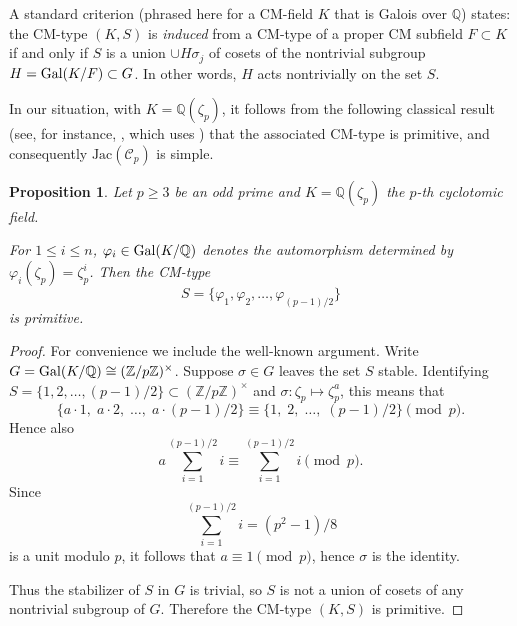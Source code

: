 \documentclass[a4paper,12pt]{amsart}
\def\Gal{{\rm Gal}}
\def\cC{{\mathcal C}}
\numberwithin{equation}{section}
\theoremstyle{plain}
\numberwithin{thm}{section}
\newtheorem{pro}[thm]{Proposition}
\begin{document}
A standard criterion (phrased here for a CM-field $K$ that is Galois over $\mathbb{Q}$) states: the CM-type $(K,S)$ is \emph{induced} from a CM-type of a proper CM subfield $F\subset K$ if and only if $S$ is a union $\cup  H\sigma_j$ of cosets of the nontrivial subgroup $H=\Gal(K/F)\subset G$.
In other words, $H$ acts nontrivially on the set $S$.

In our situation, with \(K = \mathbb{Q}(\zeta_p)\), 
it follows from the following classical result (see, for instance, \cite[page~24]{Lang}, which uses
\cite[Prop.~26]{ST}) 
that the associated CM-type is primitive, and consequently $\textrm{Jac}(\cC_p)$ is simple.



\begin{pro}
Let \(p\ge 3\) be an odd prime and \(K=\mathbb{Q}(\zeta_p)\) the $p$-th cyclotomic field.

For \(1\le i\le n\), \(\varphi_i\in\Gal(K/\mathbb{Q})\) denotes the automorphism determined by
\(\varphi_i(\zeta_p)=\zeta_p^i\).
Then the CM-type
\[
S=\{\varphi_1,\varphi_2,\dots,\varphi_{(p-1)/2}\}
\]
is primitive.
\end{pro}

\begin{proof}
For convenience we include the well-known argument. Write \(G=\Gal(K/\mathbb{Q})\cong(\mathbb{Z}/p\mathbb{Z})^\times\).
Suppose \(\sigma\in G\) leaves the set \(S\) stable. Identifying \(S= \{1,2,\dots,(p-1)/2\}\subset(\mathbb{Z}/p\mathbb{Z})^\times\) and $\sigma\colon \zeta_p\mapsto\zeta_p^a$,
this means that 
\[
\{a\cdot 1,\; a\cdot 2,\; \dots,\; a\cdot (p-1)/2\}
\equiv
\{1,\;2,\;\dots,\;(p-1)/2\}
\pmod p.
\]
Hence also
\[
a\sum_{i=1}^{(p-1)/2} i \equiv \sum_{i=1}^{(p-1)/2} i \pmod p.
\]
Since
\[
\sum_{i=1}^{(p-1)/2} i  
= (p^2-1)/8
\]
is a unit modulo \(p\), it follows that \(a\equiv 1\pmod p\), hence \(\sigma\) is the identity.

Thus the stabilizer of \(S\) in \(G\) is trivial, so \(S\) is not a union of cosets of any nontrivial subgroup of \(G\).
Therefore the CM-type \((K,S)\) is primitive.
\end{proof}
\end{document}
